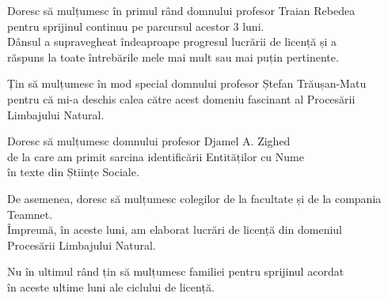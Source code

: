\vspace*{7cm}
\begin{center}
Doresc să mulțumesc în primul rând domnului profesor Traian Rebedea\\
pentru sprijinul continuu pe parcursul acestor 3 luni.\\
Dânsul a supravegheat îndeaproape progresul lucrării de licență și a\\
răspuns la toate întrebările mele mai mult sau mai puțin pertinente.
\end{center}

\vspace{0.6cm}
\begin{center}
Țin să mulțumesc în mod special domnului profesor Ștefan Trăușan-Matu\\
pentru că mi-a deschis calea către acest domeniu fascinant al Procesării Limbajului Natural.
\end{center}

\vspace{0.6cm}
\begin{center}
Doresc să mulțumesc domnului profesor Djamel A. Zighed \\
de la care am primit sarcina identificării Entităților cu Nume \\
în texte din Științe Sociale.
\end{center}

\vspace{0.6cm}
\begin{center}
De asemenea, doresc să mulțumesc colegilor de la facultate și de la compania Teamnet.\\
Împreună, în aceste luni, am elaborat lucrări de licență din domeniul\\
Procesării Limbajului Natural.
\end{center}


\vspace{0.6cm}
\begin{center}
Nu în ultimul rând țin să mulțumesc familiei pentru sprijinul acordat\\
în aceste ultime luni ale ciclului de licență.
\end{center}
